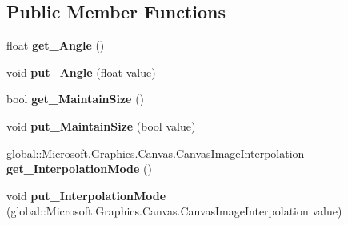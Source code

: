 \subsection*{Public Member Functions}
\begin{DoxyCompactItemize}
\item 
\mbox{\label{interface_microsoft_1_1_graphics_1_1_canvas_1_1_effects_1_1_i_straighten_effect_a4420ccc230f5230df15709e5ac5d785a}} 
float {\bfseries get\+\_\+\+Angle} ()
\item 
\mbox{\label{interface_microsoft_1_1_graphics_1_1_canvas_1_1_effects_1_1_i_straighten_effect_ab42c88ed4087e8529feb2aad22332b17}} 
void {\bfseries put\+\_\+\+Angle} (float value)
\item 
\mbox{\label{interface_microsoft_1_1_graphics_1_1_canvas_1_1_effects_1_1_i_straighten_effect_a42af54b41b4e4299bb05315818ce7183}} 
bool {\bfseries get\+\_\+\+Maintain\+Size} ()
\item 
\mbox{\label{interface_microsoft_1_1_graphics_1_1_canvas_1_1_effects_1_1_i_straighten_effect_a0d1aa7dfd257a41c147868cb49446ea6}} 
void {\bfseries put\+\_\+\+Maintain\+Size} (bool value)
\item 
\mbox{\label{interface_microsoft_1_1_graphics_1_1_canvas_1_1_effects_1_1_i_straighten_effect_aea853ec4accf5f13bcfef15bd59e5170}} 
global\+::\+Microsoft.\+Graphics.\+Canvas.\+Canvas\+Image\+Interpolation {\bfseries get\+\_\+\+Interpolation\+Mode} ()
\item 
\mbox{\label{interface_microsoft_1_1_graphics_1_1_canvas_1_1_effects_1_1_i_straighten_effect_ac4bd6a5d0b94a9b353c7cf0854c55f83}} 
void {\bfseries put\+\_\+\+Interpolation\+Mode} (global\+::\+Microsoft.\+Graphics.\+Canvas.\+Canvas\+Image\+Interpolation value)
\item 
\mbox{\label{interface_microsoft_1_1_graphics_1_1_canvas_1_1_effects_1_1_i_straighten_effect_a24ea3cfd1f2bd3a3cff7beeb3a4788a4}} 

\end{DoxyCompactItemize}
